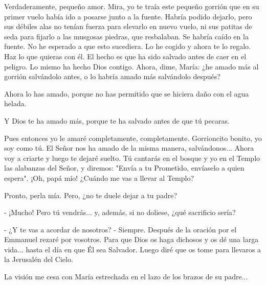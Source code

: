 \documentclass[12pt]{book} %
\begin{document}
Verdaderamente, pequeño amor. Mira, yo te traía este pequeño gorrión que en su primer vuelo había ido a posarse junto a la fuente. Habría podido dejarlo, pero sus débiles alas no tenían fuerza para elevarlo en nuevo vuelo, ni sus patitas de seda para fijarlo a las musgosas piedras, que resbalaban. Se habría caído en la fuente. No he esperado a que esto sucediera. Lo he cogido y ahora te lo regalo. Haz lo que quieras con él. El hecho es que ha sido salvado antes de caer en el peligro. Lo mismo ha hecho Dios contigo. Ahora, dime, María: ¿he amado más al gorrión salvándolo antes, o lo habría amado más salvándolo después? 

Ahora lo has amado, porque no has permitido que se hiciera daño con el agua helada. 

Y Dios te ha amado más, porque te ha salvado antes de que tú pecaras. 

Pues entonces yo le amaré completamente, completamente. Gorrioncito bonito, yo soy como tú. El Señor nos ha amado de la misma manera, salvándonos... Ahora voy a criarte y luego te dejaré suelto. Tú cantarás en el bosque y yo en el Templo las alabanzas del Señor, y diremos: "Envía a tu Prometido, envíaselo a quien espera". ¡Oh, papá mío! ¿Cuándo me vas a llevar al Templo? 

Pronto, perla mía. Pero, ¿no te duele dejar a tu padre? 

- ¡Mucho! Pero tú vendrás... y, además, si no doliese, ¿qué sacrificio sería? 

 - ¿Y te vas a acordar de nosotros? - Siempre. Después de la oración por el Emmanuel rezaré por vosotros. Para que Dios os haga dichosos y os dé una larga vida... hasta el día en que Él sea Salvador. Luego diré que os tome para llevaros a la Jerusalén del Cielo. 

La visión me cesa con María estrechada en el lazo de los brazos de su padre... 
\end{document}
